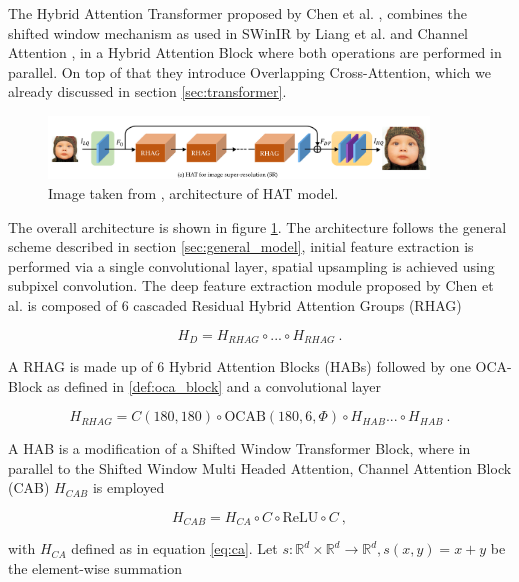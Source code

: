 The Hybrid Attention Transformer proposed by Chen et al. \cite{chenHATHybridAttention2024},
combines the shifted window mechanism as used in SWinIR by Liang et al. \cite{liangSwinIRImageRestoration2021a}
and Channel Attention \cite{zhangImageSuperResolutionUsing2018},
in a Hybrid Attention Block where both operations are performed in parallel.
On top of that they introduce Overlapping Cross-Attention, which we already discussed in section \ref{sec:transformer}.

\begin{figure}[h!]
    \includegraphics[width=0.9\textwidth]{models/sisr/imgs/hat.png}
    \caption{Image taken from \cite{chenHATHybridAttention2024}, architecture of HAT model.}
    \label{fig:hat_model}
\end{figure}

The overall architecture is shown in figure \ref{fig:hat_model}.
The architecture follows the general scheme described in section \ref{sec:general_model},
initial feature extraction is performed via a single convolutional layer,
spatial upsampling is achieved using subpixel convolution.
The deep feature extraction module proposed by Chen et al. \cite{chenHATHybridAttention2024}
is composed of $6$ cascaded Residual Hybrid Attention Groups (RHAG)

    $$ H_D = H_{RHAG} \circ ... \circ H_{RHAG} ~. $$

A RHAG is made up of $6$ Hybrid Attention Blocks (HABs) followed by one OCA-Block as defined in \ref{def:oca_block} 
and a convolutional layer

    $$ H_{RHAG} = C(180, 180) \circ \text{OCAB}(180, 6, \Phi) \circ H_{HAB} ... \circ H_{HAB}  ~. $$

A HAB is a modification of a Shifted Window Transformer Block, 
where in parallel to the Shifted Window Multi Headed Attention,
Channel Attention Block (CAB) $H_{CAB}$ is employed

    \begin{equation} \label{eq:cab}
        H_{CAB} = H_{CA} \circ C \circ \text{ReLU} \circ C ~,
    \end{equation}

with $H_{CA}$ defined as in equation \ref{eq:ca}.
Let $s: \mathbb R^{d} \times \mathbb R^{d} \to \mathbb R^d, s(x,y) = x + y$ be the element-wise summation

